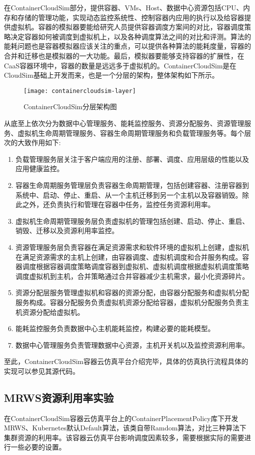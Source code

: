 在ContainerCloudSim部分，提供容器、VMs、Host、数据中心资源包括CPU、内存和存储的管理功能，实现动态监控系统性、控制容器内应用的执行以及给容器提供虚拟机。容器的模拟器要能给研究人员提供容器调度方案间的对比，容器调度策略决定容器如何被调度到虚拟机上，以及各种调度算法之间的对比和评测。算法的能耗问题也是容器模拟器应该关注的重点，可以提供各种算法的能耗度量，容器的合并和迁移也是模拟器的一大功能。最后，模拟器要能够支持容器的扩展性，在CaaS容器环境中，容器的数量是远远多于虚拟机的。ContainerCloudSim是在CloudSim基础上开发而来，也是一个分层的架构，整体架构如下所示。
\begin{figure}[H] %
	\centering
	\texttt{[image: containercloudsim-layer]}
	\caption{ContainerCloudSim分层架构图}
\end{figure}
从底至上依次分为数据中心管理服务、能耗监控服务、资源分配服务、资源管理服务、虚拟机生命周期管理服务、容器生命周期管理服务和负载管理服务等。每个层次的大致作用如下:
\begin{enumerate}
	\item 负载管理服务层关注于客户端应用的注册、部署、调度、应用层级的性能以及应用健康监控。
	\item 容器生命周期服务管理层负责容器生命周期管理，包括创建容器、注册容器到系统中、启动、停止、重启、从一个主机迁移到另一个主机以及容器销毁。除此之外，还负责执行和管理在容器中任务，监控任务资源利用率。
	\item 虚拟机生命周期管理服务层负责虚拟机的管理包括创建、启动、停止、重启、销毁、迁移以及资源利用率监控。
	\item 资源管理服务层负责容器在满足资源需求和软件环境的虚拟机上创建，虚拟机在满足资源需求的主机上创建，由容器调度、虚拟机调度和合并服务构成。容器调度根据容器调度策略调度容器到虚拟机、虚拟机调度根据虚拟机调度策略调度虚拟机到主机，合并策略通过合并容器减少主机需求，最小化资源碎片。
	\item 资源分配层服务管理虚拟机和容器的资源分配，由容器分配服务和虚拟机分配服务构成。容器分配服务负责虚拟机资源分配给容器，虚拟机分配服务负责主机资源分配给虚拟机。
	\item 能耗监控服务负责数据中心主机能耗监控，构建必要的能耗模型。
	\item 数据中心管理服务负责管理数据中心资源，主机开关机以及监控资源利用率。
\end{enumerate}
至此，ContainerCloudSim容器云仿真平台介绍完毕，具体的仿真执行流程具体的实现可以参见其源代码。

\subsection{MRWS资源利用率实验}
在ContainerCloudSim容器云仿真平台上的ContainerPlacementPolicy库下开发MRWS、Kubernetes默认Default算法，该类自带Ramdom算法，对比三种算法下集群资源的利用率。该容器云仿真平台影响调度因素较多，需要根据实际的需要进行一些必要的设置。


